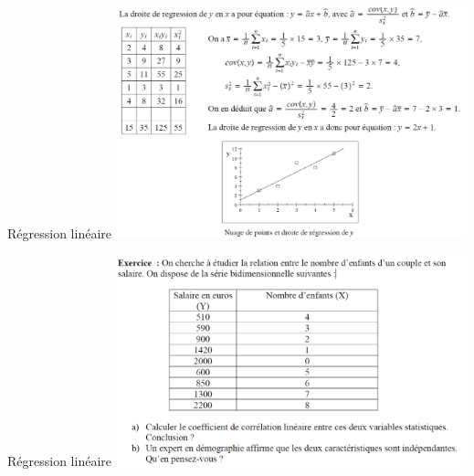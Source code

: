 \documentclass[10pt, french]{beamer}
\begin{document}
\begin{frame}{Régression linéaire}
\includegraphics[width=4in]{Images/reg_exo_cor.png}
\end{frame}
\begin{frame}{Régression linéaire}
\includegraphics[width=4in]{Images/reg_exo1.png}
\end{frame}
\end{document}
